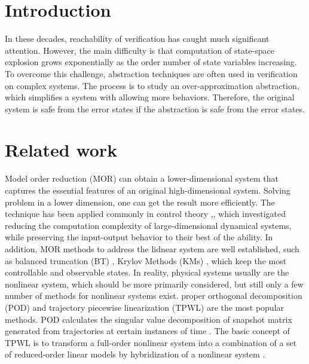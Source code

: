 \documentclass[runningheads,a4paper]{llncs}
\theoremstyle{definition}
\theoremstyle{plain}
\begin{document}
\section{Introduction}
In these decades, reachability of verification has caught much significant attention. However, the main difficulty is that computation of state-space explosion grows exponentially as the order number of state variables increasing. To overcome this challenge, abstraction techniques are often used in verification on complex systems. The process is to study an over-approximation abstraction, which simplifies a system with allowing more behaviors. Therefore, the original system is safe from the error states if the abstraction is safe from the error states.\\
\section{Related work}
Model order reduction (MOR) can obtain a lower-dimensional system that captures the essential features of an original high-dimensional system. Solving problem in a lower dimension, one can get the result more efficiently. The technique has been applied commonly in control theory \cite{Lall02asubspace},\cite{doi:10.1080/00207170410001713448}, which investigated reducing the computation complexity of large-dimensional dynamical systems, while preserving the input-output behavior to their best of the ability. In addition, MOR methods to address the lidnear system are well established, such as balanced truncation (BT) \cite{Lall02asubspace}, Krylov Methods (KMs) \cite{SALIMBAHRAMI2006385}, which keep the most controllable and observable states. In reality, physical systems usually are the nonlinear system, which should be more primarily considered, but still only a few number of methods for nonlinear systems exist. proper orthogonal decomposition (POD) and trajectory piecewise linearization (TPWL) are the most popular methods. POD calculates the singular value decomposition of snapshot matrix generated from trajectories at certain instances of time \cite{Pinnau2008}. The basic concept of TPWL is to transform a full-order nonlinear system into a combination of a set of reduced-order linear models by hybridization of a nonlinear system \cite{REWIENSKI2006426}.\\
\end{document}
